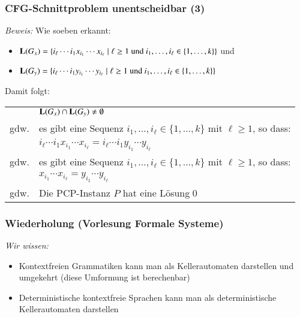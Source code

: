 \documentclass[aspectratio=1610,onlymath]{beamer}
\begin{document}
\begin{frame}[t]\frametitle{CFG-Schnittproblem unentscheidbar (3)}

\emph{Beweis:} Wie soeben erkannt:
\begin{itemize}
\item $\textbf{\textcolor{black}{L}}(G_x)=\{ i_\ell\cdots i_1 x_{i_1}\cdots x_{i_\ell}\mid \ell\geq 1\text{ und } i_1,\ldots,i_\ell\in\{1,\ldots,k\}\}$ und
\item $\textbf{\textcolor{black}{L}}(G_y)=\{ i_\ell\cdots i_1 y_{i_1}\cdots y_{i_\ell}\mid \ell\geq 1\text{ und } i_1,\ldots,i_\ell\in\{1,\ldots,k\}\}$
\end{itemize}\bigskip\pause

Damit folgt:\medskip

\begin{tabular}{rl}
& $\textbf{\textcolor{black}{L}}(G_x)\cap\textbf{\textcolor{black}{L}}(G_y)\neq\emptyset$\\\pause
gdw. & es gibt eine Sequenz $i_1,\ldots,i_\ell\in\{1,\ldots,k\}$ mit $\ell\geq 1$, so dass:\\
	& $ i_\ell\cdots i_1 x_{i_1}\cdots x_{i_\ell} = i_\ell\cdots i_1 y_{i_1}\cdots y_{i_\ell}$\\\pause
gdw. & es gibt eine Sequenz $i_1,\ldots,i_\ell\in\{1,\ldots,k\}$ mit $\ell\geq 1$, so dass:\\
	& $ x_{i_1}\cdots x_{i_\ell} = y_{i_1}\cdots y_{i_\ell}$\\\pause
gdw. &  Die PCP-Instanz $P$ hat eine Lösung\qed\\
\end{tabular}

\end{frame}


\begin{frame}\frametitle{Wiederholung (Vorlesung Formale Systeme)}

\emph{Wir wissen:}
\begin{itemize}
\item Kontextfreien Grammatiken kann man als Kellerautomaten darstellen und umgekehrt
 (diese Umformung ist berechenbar)
\item Deterministische kontextfreie Sprachen kann man als deterministische Kellerautomaten darstellen
\end{itemize}
\bigskip


\end{frame}
\end{document}
